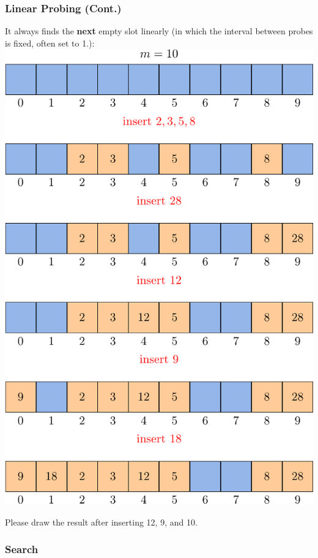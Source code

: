 \documentclass[aspectratio=169, 14pt]{beamer}
\begin{document}
\begin{frame}
    \frametitle{Linear Probing (Cont.)}
    It always finds the \textbf{next} empty slot \alert{linearly} (in which the interval between probes is fixed, often set to 1.):
    \includegraphics[width=.7\textwidth, trim={0 9cm 0 5.5cm},clip]{week11/probe}

 Please draw the result after inserting 12, 9, and 10.
\end{frame}

\begin{frame}[fragile]
    \frametitle{Search}


\end{frame}
\end{document}
